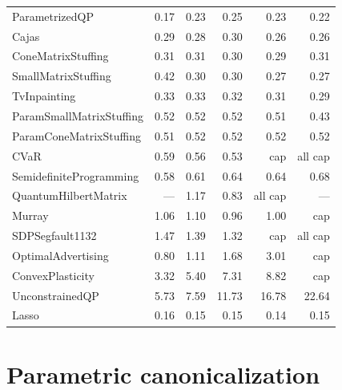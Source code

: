 \begin{table}[htbp]
{\begin{tabular}{l rrrrr}
ParametrizedQP              &    0.17 &    0.23 &    0.25 &    0.23 &    0.22 \\
Cajas                       &    0.29 &    0.28 &    0.30 &    0.26 &    0.26 \\
ConeMatrixStuffing          &    0.31 &    0.31 &    0.30 &    0.29 &    0.31 \\
SmallMatrixStuffing         &    0.42 &    0.30 &    0.30 &    0.27 &    0.27 \\
TvInpainting                &    0.33 &    0.33 &    0.32 &    0.31 &    0.29 \\
ParamSmallMatrixStuffing    &    0.52 &    0.52 &    0.52 &    0.51 &    0.43 \\
ParamConeMatrixStuffing     &    0.51 &    0.52 &    0.52 &    0.52 &    0.52 \\
CVaR                        &    0.59 &    0.56 &    0.53 &     cap & all cap \\
SemidefiniteProgramming     &    0.58 &    0.61 &    0.64 &    0.64 &    0.68 \\
QuantumHilbertMatrix        &     --- &    1.17 &    0.83 & all cap &     --- \\
Murray                      &    1.06 &    1.10 &    0.96 &    1.00 &     cap \\
SDPSegfault1132             &    1.47 &    1.39 &    1.32 &     cap & all cap \\
OptimalAdvertising          &    0.80 &    1.11 &    1.68 &    3.01 &     cap \\
ConvexPlasticity            &    3.32 &    5.40 &    7.31 &    8.82 &     cap \\
UnconstrainedQP             &    5.73 &    7.59 &   11.73 &   16.78 &   22.64 \\
Lasso                       &    0.16 &    0.15 &    0.15 &    0.14 &    0.15 \\
\bottomrule
\end{tabular}}
\end{table}

\FloatBarrier

\section{Parametric canonicalization}
\label{sec:bench-param}

